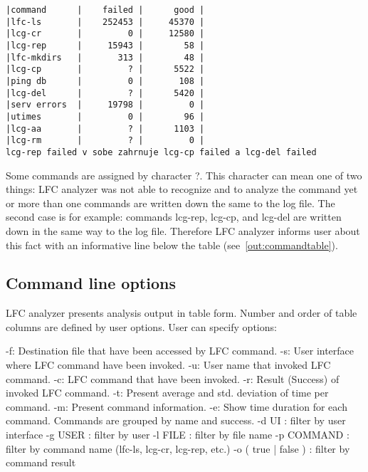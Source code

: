 \documentclass[a4paper, 11pt]{article} %
\begin{document}
\begin{lstlisting}[style=cli, label={out:commandtable}, caption={lfc\_analyzer -i logfile}]
|command      |    failed |      good |
|lfc-ls       |    252453 |     45370 |
|lcg-cr       |         0 |     12580 |
|lcg-rep      |     15943 |        58 |
|lfc-mkdirs   |       313 |        48 |
|lcg-cp       |         ? |      5522 |
|ping db      |         0 |       108 |
|lcg-del      |         ? |      5420 |
|serv errors  |     19798 |         0 |
|utimes       |         0 |        96 |
|lcg-aa       |         ? |      1103 |
|lcg-rm       |         ? |         0 |
lcg-rep failed v sobe zahrnuje lcg-cp failed a lcg-del failed
\end{lstlisting}

Some commands are assigned by character ?. This character can mean one of two things: LFC analyzer was not able to recognize and to analyze the command yet or more than one commands are written down the same to the log file. The second case is for example: commands lcg-rep, lcg-cp, and lcg-del are written down in the same way to the log file. Therefore LFC analyzer informs user about this fact with an informative line below the table (see~\ref{out:commandtable}).

\subsection{Command line options}

LFC analyzer presents analysis output in table form. Number and order of table columns are defined by user options. User can specify options:

 -f: Destination file that have been accessed by LFC command.
 -s: User interface where LFC command have been invoked.
 -u: User name that invoked LFC command.
 -c: LFC command that have been invoked.
 -r: Result (Success) of invoked LFC command.
 -t: Present average and std. deviation of time per command.
 -m: Present command information.
 -e: Show time duration for each command. Commands are grouped by name and success.
 -d UI : filter by user interface
 -g USER : filter by user
 -l FILE : filter by file name
 -p COMMAND : filter by command name (lfc-ls, lcg-cr, lcg-rep, etc.)
 -o ( true | false ) : filter by command result
\end{document}
